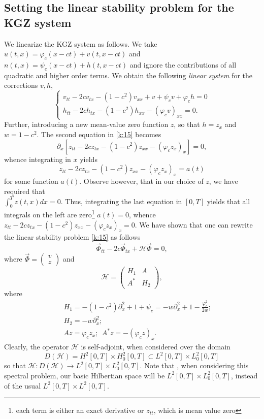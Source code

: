 \documentclass[final,11pt,leqno]{amsart}
\begin{document}
 \subsection{Setting the linear stability problem for the KGZ system}
 We linearize the KGZ system as follows. We take $u(t,x)={\varphi}_c(x-c t)+v(t, x-c t)$ and $n(t,x)=\psi_c(x-ct)+h(t,x-ct)$ and ignore the contributions of
 all quadratic and higher order terms. We obtain the following {\it linear system} for the corrections $v,h$,
 \begin{equation}
 \label{k:15}
 \left\{\begin{array}{l}
 v_{tt}-2c v_{t x}-(1-c^2) v_{xx}+v+\psi_c v+{\varphi}_c h=0 \\
 h_{tt}-2c h_{t x}-(1-c^2) h_{xx}-({\varphi}_c v)_{xx}=0.
 \end{array}
 \right.
 \end{equation}
 Further, introducing a new mean-value zero function $z$, so that $h=z_x$ and
 $w=1-c^2$. The second equation in \eqref{k:15} becomes
 $$
 {\partial}_x[z_{tt}-2c z_{t x}-(1-c^2) z_{xx}-({\varphi}_c z_x)_{x}]=0,
 $$
 whence integrating in $x$ yields
 $$
 z_{tt}-2c z_{t x}-(1-c^2) z_{xx}-({\varphi}_c z_x)_{x}=a(t)
 $$
  for some function $a(t)$. Observe however, that in our choice of $z$, we have required that \\ $\int_0^T z(t,x) dx=0$. Thus, integrating the last
  equation in $[0,T]$ yields that all integrals on the left are zero\footnote{each term is either an exact derivative or $z_{tt}$, which is mean value zero}
   $a(t)=0$, whence $z_{tt}-2c z_{t x}-(1-c^2) z_{xx}-({\varphi}_c z_x)_{x}=0$. We have shown that one can rewrite the linear stability problem \eqref{k:15} as follows
 \begin{equation}
\label{k:20}
\vec{\Phi}_{tt}-2c \vec{\Phi}_{tx}+{\mathcal H} \vec{\Phi}=0,
\end{equation}
where $\vec{\Phi}=\left(\begin{array}{c} v \\ z \end{array}\right)$ and
\begin{equation}
\label{k:22}
{\mathcal H}=\left(\begin{array}{cc} H_1 & A \\ A^* & H_2 \end{array}\right),
\end{equation}
where
\begin{eqnarray*}
& & H_1=-(1-c^2){\partial}^2_x+1 +\psi_c= -w {\partial}^2_x +1 -{\frac{{{\varphi}^2_c}}{{2 w}}};  \\
& & H_2=-w{\partial}^2_x; \\
& & A z ={\varphi}_c z_x;  \ \ A^* z=-({\varphi}_c z)_x.
\end{eqnarray*}
Clearly, the operator ${\mathcal H}$ is self-adjoint, when considered over the domain
$$
D({\mathcal H})=H^2[0,T]\times H^2_0[0,T] \subset L^2[0,T]\times L^2_0[0,T]
$$
so that ${\mathcal H}: D({\mathcal H})\to  L^2[0,T]\times L^2_0[0,T]$. Note that , when considering this spectral problem, our basic Hilbertian  space will be
$L^2[0,T]\times L^2_0[0,T]$, instead of the usual $L^2[0,T]\times L^2[0,T]$.
\end{document}
